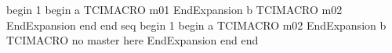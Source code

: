 begin
1
begin
a
TCIMACRO
m01
EndExpansion
b
TCIMACRO
m02
EndExpansion
end
end
seq
begin
1
begin
a
TCIMACRO
m02
EndExpansion
b
TCIMACRO
no master here
EndExpansion
end
end
